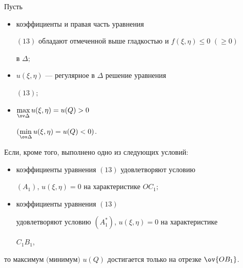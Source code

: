 \begin{thm}


Пусть


\begin{itemize}


\item[1)] коэффициенты и правая часть уравнения 


$(13)$ обладают отмеченной выше гладкостью и $f(\xi,\eta)\le 0$ $(\ge 0)$


в $\Delta;$ 


\item[2)] $u(\xi,\eta)$ --- регулярное в $\Delta$ решение уравнения


$(13);$


\item[3)] $\max\limits_{\ov \Delta} u(\xi,\eta)=u(Q)>0$


$(\min \limits_{\ov \Delta} u(\xi,\eta)=u(Q)<0)$.


\end{itemize}


Если, кроме того, выполнено одно из следующих условий${:}$


\begin{itemize}


\begin{itemize}


\item[a)] коэффициенты уравнения $(13)$ удовлетворяют условию


$(A_1)$, $u(\xi,\eta)=0$ на характеристике $OC_1;$


\item[б)] коэффициенты уравнения $(13)$


удовлетворяют условию $(A_1^*)$, $u(\xi,\eta)=0$ на характеристике


$C_1B_1$,


\end{itemize}


\end{itemize}


то максимум $($минимум$)$ $u(Q)$ достигается только на отрезке $\ov 


{OB_1}$.


\end{thm}





